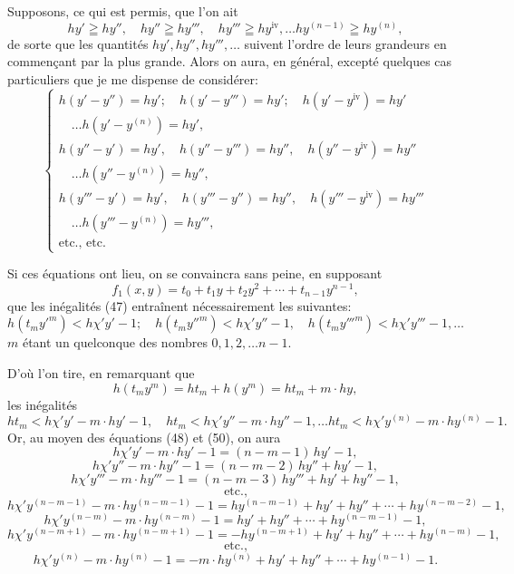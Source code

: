 \documentclass{article}
\begin{document}
Supposons, ce qui est permis, que l'on ait
\[ hy' \geqq hy'', \quad hy'' \geqq hy''', \quad hy''' \geqq hy^{\text{iv}}, \ldots hy^{(n-1)} \geqq hy^{(n)}, \tag{49} \]
de sorte que les quantités $hy', hy'', hy''', \ldots$ suivent l'ordre de leurs grandeurs en commençant par la plus grande. Alors on aura, en général, excepté quelques cas particuliers que je me dispense de considérer:
\[ \begin{cases}
h(y'-y'') = hy'; \quad h(y'-y''') = hy'; \quad h(y'-y^{\text{iv}}) = hy' \\
\quad \ldots h(y'-y^{(n)}) = hy', \\
h(y''-y') = hy', \quad h(y''-y''') = hy'', \quad h(y''-y^{\text{iv}}) = hy'' \\
\quad \ldots h(y''-y^{(n)}) = hy'', \\
h(y'''-y') = hy', \quad h(y'''-y'') = hy'', \quad h(y'''-y^{\text{iv}}) = hy''' \\
\quad \ldots h(y'''-y^{(n)}) = hy''', \\
\text{etc., etc.}
\end{cases} \tag{50} \]

Si ces équations ont lieu, on se convaincra sans peine, en supposant
\[ f_1(x, y) = t_0 + t_1 y + t_2 y^{2} + \cdots + t_{n-1} y^{n-1}, \tag{51} \]
que les inégalités (47) entraînent nécessairement les suivantes:
\[ h(t_m y'^{m}) < h\chi' y' - 1; \quad h(t_m y''^{m}) < h\chi' y'' - 1, \quad h(t_m y'''^{m}) < h\chi' y''' - 1, \ldots \tag{52} \]
$m$ étant un quelconque des nombres $0, 1, 2, \ldots n-1$.

D'où l'on tire, en remarquant que
\[ h(t_m y^{m}) = ht_m + h(y^{m}) = ht_m + m \cdot hy, \]
les inégalités
\[ ht_m < h\chi' y' - m \cdot hy' - 1, \quad ht_m < h\chi' y'' - m \cdot hy'' - 1, \ldots ht_m < h\chi' y^{(n)} - m \cdot hy^{(n)} - 1. \]
Or, au moyen des équations (48) et (50), on aura
\[ h\chi' y' - m \cdot hy' - 1 = (n-m-1)\,hy' - 1, \]
\[ h\chi' y'' - m \cdot hy'' - 1 = (n-m-2)\,hy'' + hy' - 1, \]
\[ h\chi' y''' - m \cdot hy''' - 1 = (n-m-3)\,hy''' + hy' + hy'' - 1, \]
\[ \text{etc.,} \]
\[ h\chi' y^{(n-m-1)} - m \cdot hy^{(n-m-1)} - 1 = hy^{(n-m-1)} + hy' + hy'' + \cdots + hy^{(n-m-2)} - 1, \]
\[ h\chi' y^{(n-m)} - m \cdot hy^{(n-m)} - 1 = hy' + hy'' + \cdots + hy^{(n-m-1)} - 1, \]
\[ h\chi' y^{(n-m+1)} - m \cdot hy^{(n-m+1)} - 1 = -hy^{(n-m+1)} + hy' + hy'' + \cdots + hy^{(n-m)} - 1, \]
\[ \text{etc.,} \]
\[ h\chi' y^{(n)} - m \cdot hy^{(n)} - 1 = -m \cdot hy^{(n)} + hy' + hy'' + \cdots + hy^{(n-1)} - 1. \]
\end{document}
